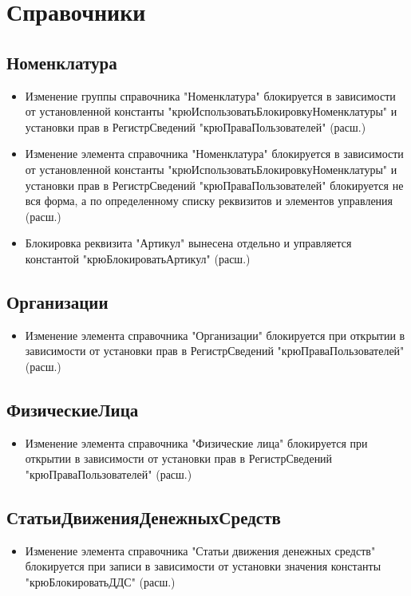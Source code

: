 \section{Справочники}
\subsection{Номенклатура}

\begin{itemize}
	\item Изменение группы справочника "Номенклатура" блокируется в зависимости от установленной константы "крюИспользоватьБлокировкуНоменклатуры" и установки прав в РегистрСведений "крюПраваПользователей" (расш.)
	\item Изменение элемента справочника  "Номенклатура" блокируется в зависимости от установленной константы "крюИспользоватьБлокировкуНоменклатуры" и установки прав в РегистрСведений
	"крюПраваПользователей" блокируется не вся форма, а по определенному списку реквизитов и элементов управления
	(расш.) 
	\item Блокировка реквизита "Артикул" вынесена отдельно и управляется константой "крюБлокироватьАртикул" 
	(расш.) 	
\end{itemize}

\subsection{Организации}

\begin{itemize}

	\item Изменение элемента справочника  "Организации" блокируется при открытии в зависимости от установки прав в РегистрСведений "крюПраваПользователей" 
	(расш.) 
	
\end{itemize}


\subsection{ФизическиеЛица}

\begin{itemize}
	
	\item Изменение элемента справочника  "Физические лица" блокируется при открытии в зависимости от установки прав в РегистрСведений "крюПраваПользователей" 
	(расш.) 
	
\end{itemize}


\subsection{СтатьиДвиженияДенежныхСредств}

\begin{itemize}
	
	\item Изменение элемента справочника  "Статьи движения денежных средств" блокируется при записи в зависимости от установки значения константы "крюБлокироватьДДС" 
	(расш.) 
	
\end{itemize}

